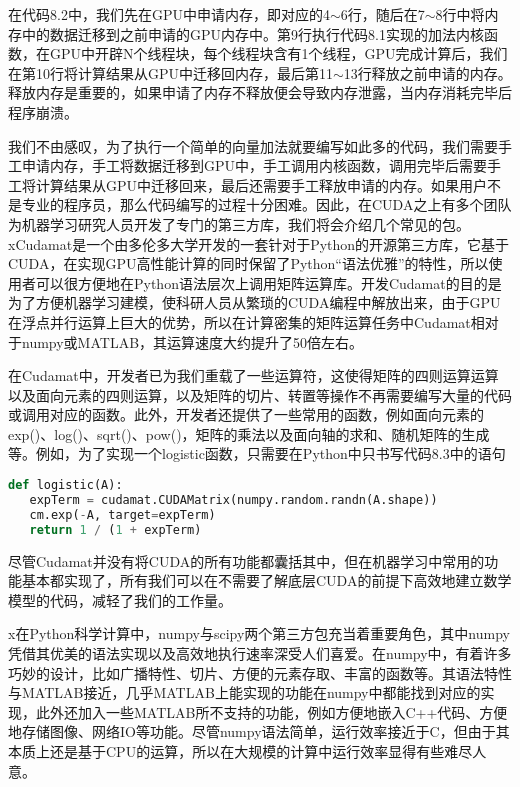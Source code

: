 在代码8.2中，我们先在GPU中申请内存，即对应的4$\sim$6行，随后在7$\sim$8行中将内存中的数据迁移到之前申请的GPU内存中。第9行执行代码8.1实现的加法内核函数，在GPU中开辟N个线程块，每个线程块含有1个线程，GPU完成计算后，我们在第10行将计算结果从GPU中迁移回内存，最后第11$\sim$13行释放之前申请的内存。释放内存是重要的，如果申请了内存不释放便会导致内存泄露，当内存消耗完毕后程序崩溃。

我们不由感叹，为了执行一个简单的向量加法就要编写如此多的代码，我们需要手工申请内存，手工将数据迁移到GPU中，手工调用内核函数，调用完毕后需要手工将计算结果从GPU中迁移回来，最后还需要手工释放申请的内存。如果用户不是专业的程序员，那么代码编写的过程十分困难。因此，在CUDA之上有多个团队为机器学习研究人员开发了专门的第三方库，我们将会介绍几个常见的包。
xCudamat是一个由多伦多大学开发的一套针对于Python的开源第三方库，它基于CUDA，在实现GPU高性能计算的同时保留了Python“语法优雅”的特性，所以使用者可以很方便地在Python语法层次上调用矩阵运算库。开发Cudamat的目的是为了方便机器学习建模，使科研人员从繁琐的CUDA编程中解放出来，由于GPU在浮点并行运算上巨大的优势，所以在计算密集的矩阵运算任务中Cudamat相对于numpy或MATLAB，其运算速度大约提升了50倍左右。

在Cudamat中，开发者已为我们重载了一些运算符，这使得矩阵的四则运算运算以及面向元素的四则运算，以及矩阵的切片、转置等操作不再需要编写大量的代码或调用对应的函数。此外，开发者还提供了一些常用的函数，例如面向元素的exp()、log()、sqrt()、pow()，矩阵的乘法以及面向轴的求和、随机矩阵的生成等。例如，为了实现一个logistic函数，只需要在Python中只书写代码8.3中的语句

\begin{lstlisting}[language=Python, frame=shadowbox, rulesepcolor=\color{cadegrey}, caption=\text{Cudamat中logistic的实现}]
def logistic(A):
   expTerm = cudamat.CUDAMatrix(numpy.random.randn(A.shape))
   cm.exp(-A, target=expTerm)
   return 1 / (1 + expTerm)
\end{lstlisting}

尽管Cudamat并没有将CUDA的所有功能都囊括其中，但在机器学习中常用的功能基本都实现了，所有我们可以在不需要了解底层CUDA的前提下高效地建立数学模型的代码，减轻了我们的工作量。


x在Python科学计算中，numpy与scipy两个第三方包充当着重要角色，其中numpy凭借其优美的语法实现以及高效地执行速率深受人们喜爱。在numpy中，有着许多巧妙的设计，比如广播特性、切片、方便的元素存取、丰富的函数等。其语法特性与MATLAB接近，几乎MATLAB上能实现的功能在numpy中都能找到对应的实现，此外还加入一些MATLAB所不支持的功能，例如方便地嵌入C++代码、方便地存储图像、网络IO等功能。尽管numpy语法简单，运行效率接近于C，但由于其本质上还是基于CPU的运算，所以在大规模的计算中运行效率显得有些难尽人意。


